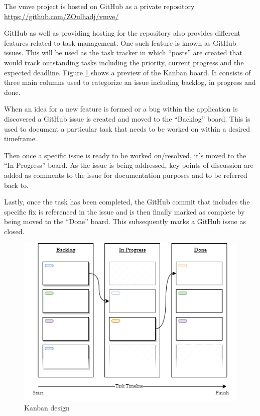 \documentclass[11pt]{article}
\begin{document}
The \gls*{vmve} project is hosted on GitHub as a private repository
\url{https://github.com/ZOulhadj/vmve/}


GitHub as well as providing hosting for the repository also provides different
features related to task management. One such feature is known as GitHub issues.
This will be used as the task tracker in which ``posts'' are created that would
track outstanding tasks including the priority, current progress and the
expected deadline. Figure \ref{fig:kanban_design} shows a preview of the Kanban
board. It consists of three main columns used to categorize an issue including
backlog, in progress and done. 

When an idea for a new feature is formed or a bug within the application is
discovered a GitHub issue is created and moved to the ``Backlog'' board. This is
used to document a particular task that needs to be worked on within a desired
timeframe.

Then once a specific issue is ready to be worked on/resolved, it's moved to the
``In Progress'' board. As the issue is being addressed, key points of discussion
are added as comments to the issue for documentation purposes and to be referred
back to.

Lastly, once the task has been completed, the GitHub commit that includes the
specific fix is referenced in the issue and is then finally marked as complete
by being moved to the ``Done'' board. This subsequently marks a GitHub issue as
closed.

\begin{figure}[H]
  \centering
  \includegraphics[width=\textwidth]{images/kanban_design.png}
  \caption{Kanban design}
  \label{fig:kanban_design}
\end{figure}
\end{document}
